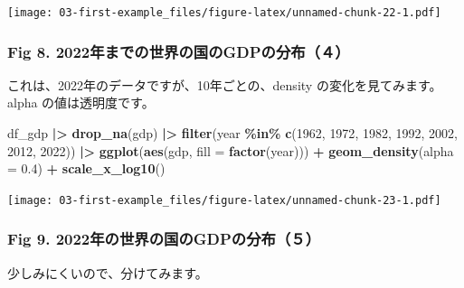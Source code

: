 \documentclass[
  xelatex, ja=standard]{bxjsbook}
\newenvironment{Shaded}{\begin{snugshade}}{\end{snugshade}}
\newcommand{\AttributeTok}[1]{\textcolor[rgb]{0.13,0.29,0.53}{#1}}
\newcommand{\DecValTok}[1]{\textcolor[rgb]{0.00,0.00,0.81}{#1}}
\newcommand{\FloatTok}[1]{\textcolor[rgb]{0.00,0.00,0.81}{#1}}
\newcommand{\FunctionTok}[1]{\textcolor[rgb]{0.13,0.29,0.53}{\textbf{#1}}}
\newcommand{\NormalTok}[1]{#1}
\newcommand{\SpecialCharTok}[1]{\textcolor[rgb]{0.81,0.36,0.00}{\textbf{#1}}}
\theoremstyle{definition}
\theoremstyle{definition}
\theoremstyle{definition}
\theoremstyle{definition}
\theoremstyle{remark}
\begin{document}
\texttt{[image: 03-first-example\_files/figure-latex/unnamed-chunk-22-1.pdf]}

\hypertarget{fig-8.-2022ux5e74ux307eux3067ux306eux4e16ux754cux306eux56fdux306egdpux306eux5206ux5e03uxff14}{%
\subsubsection{Fig 8. 2022年までの世界の国のGDPの分布（４）}\label{fig-8.-2022ux5e74ux307eux3067ux306eux4e16ux754cux306eux56fdux306egdpux306eux5206ux5e03uxff14}}

これは、2022年のデータですが、10年ごとの、density の変化を見てみます。alpha の値は透明度です。

\begin{Shaded}
\begin{Highlighting}[]
\NormalTok{df\_gdp }\SpecialCharTok{|\textgreater{}} \FunctionTok{drop\_na}\NormalTok{(gdp) }\SpecialCharTok{|\textgreater{}} 
  \FunctionTok{filter}\NormalTok{(year }\SpecialCharTok{\%in\%} \FunctionTok{c}\NormalTok{(}\DecValTok{1962}\NormalTok{, }\DecValTok{1972}\NormalTok{, }\DecValTok{1982}\NormalTok{, }\DecValTok{1992}\NormalTok{, }\DecValTok{2002}\NormalTok{, }\DecValTok{2012}\NormalTok{, }\DecValTok{2022}\NormalTok{)) }\SpecialCharTok{|\textgreater{}}
  \FunctionTok{ggplot}\NormalTok{(}\FunctionTok{aes}\NormalTok{(gdp, }\AttributeTok{fill =} \FunctionTok{factor}\NormalTok{(year))) }\SpecialCharTok{+} \FunctionTok{geom\_density}\NormalTok{(}\AttributeTok{alpha =} \FloatTok{0.4}\NormalTok{) }\SpecialCharTok{+} \FunctionTok{scale\_x\_log10}\NormalTok{()}
\end{Highlighting}
\end{Shaded}

\texttt{[image: 03-first-example\_files/figure-latex/unnamed-chunk-23-1.pdf]}

\hypertarget{fig-9.-2022ux5e74ux306eux4e16ux754cux306eux56fdux306egdpux306eux5206ux5e03uxff15}{%
\subsubsection{Fig 9. 2022年の世界の国のGDPの分布（５）}\label{fig-9.-2022ux5e74ux306eux4e16ux754cux306eux56fdux306egdpux306eux5206ux5e03uxff15}}

少しみにくいので、分けてみます。
\end{document}
